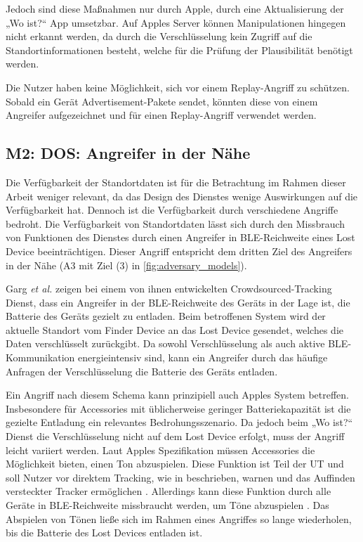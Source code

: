 Jedoch sind diese Maßnahmen nur durch Apple, durch eine Aktualisierung der „Wo ist?“ App umsetzbar. 
Auf Apples Server können Manipulationen hingegen nicht erkannt werden, da durch die Verschlüsselung kein Zugriff auf die Standortinformationen besteht, welche für die Prüfung der Plausibilität benötigt werden.

Die Nutzer haben keine Möglichkeit, sich vor einem Replay-Angriff zu schützen.
Sobald ein Gerät Advertisement-Pakete sendet, könnten diese von einem Angreifer aufgezeichnet und für einen Replay-Angriff verwendet werden.


\subsection[M2]{M2: \ac{DOS}: Angreifer in der Nähe}
\label{missbrauch:2}
Die Verfügbarkeit der Standortdaten ist für die Betrachtung im Rahmen dieser Arbeit weniger relevant, da das Design des Dienstes wenige Auswirkungen auf die Verfügbarkeit hat.
Dennoch ist die Verfügbarkeit durch verschiedene Angriffe bedroht.
Die Verfügbarkeit von Standortdaten lässt sich durch den Missbrauch von Funktionen des Dienstes durch einen Angreifer in \ac{BLE}-Reichweite eines Lost Device beeinträchtigen.
Dieser Angriff entspricht dem dritten Ziel des Angreifers in der Nähe (A3 mit Ziel (3) in \autoref{fig:adversary_models}).

Garg \textit{et al.} \cite{Garg_Secure_Tracker} zeigen bei einem von ihnen entwickelten Crowdsourced-Tracking Dienst, dass ein Angreifer in der \ac{BLE}-Reichweite des Geräts in der Lage ist, die Batterie des Geräts gezielt zu entladen.
Beim betroffenen System wird der aktuelle Standort vom Finder Device an das Lost Device gesendet, welches die Daten verschlüsselt zurückgibt.
Da sowohl Verschlüsselung als auch aktive \ac{BLE}-Kommunikation energieintensiv sind, kann ein Angreifer durch das häufige Anfragen der Verschlüsselung die Batterie des Geräts entladen.

Ein Angriff nach diesem Schema kann prinzipiell auch Apples System betreffen.
Insbesondere für Accessories mit üblicherweise geringer Batteriekapazität ist die gezielte Entladung ein relevantes Bedrohungsszenario.
Da jedoch beim „Wo ist?“ Dienst die Verschlüsselung nicht auf dem Lost Device erfolgt, muss der Angriff leicht variiert werden.
Laut Apples Spezifikation müssen Accessories die Möglichkeit bieten, einen Ton abzuspielen.
Diese Funktion ist Teil der \ac{UT} und soll Nutzer vor direktem Tracking, wie in  beschrieben, warnen und das Auffinden versteckter Tracker ermöglichen \cite{Apple_FindMySpec}.
Allerdings kann diese Funktion durch alle Geräte in \ac{BLE}-Reichweite missbraucht werden, um Töne abzuspielen \cite{Heinrich_AirGuard}.
Das Abspielen von Tönen ließe sich im Rahmen eines Angriffes so lange wiederholen, bis die Batterie des Lost Devices entladen ist.

